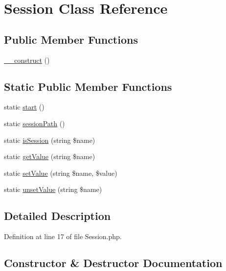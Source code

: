 \hypertarget{class_zest_1_1_session_1_1_session}{}\section{Session Class Reference}
\label{class_zest_1_1_session_1_1_session}
\subsection*{Public Member Functions}
\begin{DoxyCompactItemize}
\item 
\mbox{\hyperlink{class_zest_1_1_session_1_1_session_a095c5d389db211932136b53f25f39685}{\+\_\+\+\_\+construct}} ()
\end{DoxyCompactItemize}
\subsection*{Static Public Member Functions}
\begin{DoxyCompactItemize}
\item 
static \mbox{\hyperlink{class_zest_1_1_session_1_1_session_a146085d0f3a9d17bdcd7f3d4081d8c0d}{start}} ()
\item 
static \mbox{\hyperlink{class_zest_1_1_session_1_1_session_a10b1cecd11adec8f2067f7ed052dbbf0}{session\+Path}} ()
\item 
static \mbox{\hyperlink{class_zest_1_1_session_1_1_session_a93da4b5810cd219a403be01d51eaf8ec}{is\+Session}} (string \$name)
\item 
static \mbox{\hyperlink{class_zest_1_1_session_1_1_session_acba3a14ff7bb42eedd40d5e8a8f846c2}{get\+Value}} (string \$name)
\item 
static \mbox{\hyperlink{class_zest_1_1_session_1_1_session_a5d3c77dc00e3090cbd79986dc2c4d841}{set\+Value}} (string \$name, \$value)
\item 
static \mbox{\hyperlink{class_zest_1_1_session_1_1_session_aaea4a8cdb751723a388c9d8df2c374f6}{unset\+Value}} (string \$name)
\end{DoxyCompactItemize}


\subsection{Detailed Description}


Definition at line 17 of file Session.\+php.



\subsection{Constructor \& Destructor Documentation}
\mbox{\label{class_zest_1_1_session_1_1_session_a095c5d389db211932136b53f25f39685}} 
